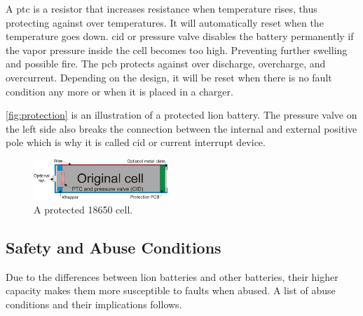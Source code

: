 A \gls{ptc} is a resistor that increases resistance when temperature rises, thus protecting against over temperatures. It will automatically reset when the temperature goes down.
\gls{cid} or pressure valve disables the battery permanently if the vapor pressure inside the cell becomes too high. Preventing further swelling and possible fire.
The \gls{pcb} protects against over discharge, overcharge, and overcurrent. Depending on the design, it will be reset when there is no fault condition any more or when it is placed in a charger.  

\autoref{fig:protection} is an illustration of a protected \gls{lion} battery. The pressure valve on the left side also breaks the connection between the internal and external positive pole which is why it is called \gls{cid} or current interrupt device.

\begin{figure}[H]
	\centering
	\includegraphics[width=0.45\textwidth]{Figures/protection.png}
	\caption{A protected 18650 cell.}
	\label{fig:protection}
\end{figure}

\subsection{Safety and Abuse Conditions}
Due to the differences between \gls{lion} batteries and other batteries, their higher capacity makes them more susceptible to faults when abused. A list of abuse conditions and their implications follows\cite{book35}.

